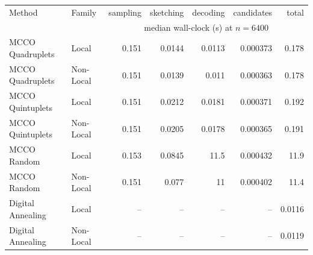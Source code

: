 \begin{tabular}{llrrrrr}
\hline
Method & Family & sampling & sketching & decoding & candidates & total \\
 & & \multicolumn{5}{c}{median wall-clock (s) at $n = 6400$} \\
\hline
MCCO Quadruplets & Local & 0.151 & 0.0144 & 0.0113 & 0.000373 & 0.178 \\
MCCO Quadruplets & Non-Local & 0.151 & 0.0139 & 0.011 & 0.000363 & 0.178 \\
MCCO Quintuplets & Local & 0.151 & 0.0212 & 0.0181 & 0.000371 & 0.192 \\
MCCO Quintuplets & Non-Local & 0.151 & 0.0205 & 0.0178 & 0.000365 & 0.191 \\
MCCO Random & Local & 0.153 & 0.0845 & 11.5 & 0.000432 & 11.9 \\
MCCO Random & Non-Local & 0.151 & 0.077 & 11 & 0.000402 & 11.4 \\
Digital Annealing & Local & -- & -- & -- & -- & 0.0116 \\
Digital Annealing & Non-Local & -- & -- & -- & -- & 0.0119 \\
\hline
\end{tabular}
